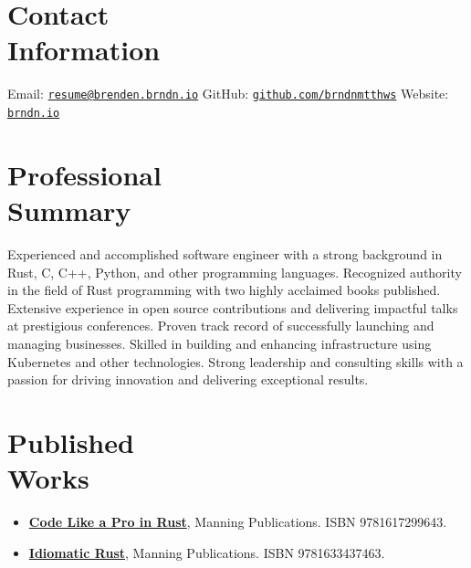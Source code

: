 \documentclass[margin,line]{resume}
\begin{document}
 
\begin{resume}

\section{\mysidestyle Contact\\Information}

Email: \href{mailto:resume@brenden.brndn.io}{\texttt{resume@brenden.brndn.io}} \hfill
GitHub: \href{https://github.com/brndnmtthws}{\texttt{github.com/brndnmtthws}} \hfill
Website: \href{https://brndn.io}{\texttt{brndn.io}} \hfill
\vspace{3mm}

\section{\mysidestyle Professional\\Summary}

Experienced and accomplished software engineer with a strong background in Rust, C, C++, Python, and other programming languages. Recognized authority in the field of Rust programming with two highly acclaimed books published. Extensive experience in open source contributions and delivering impactful talks at prestigious conferences. Proven track record of successfully launching and managing businesses. Skilled in building and enhancing infrastructure using Kubernetes and other technologies. Strong leadership and consulting skills with a passion for driving innovation and delivering exceptional results.

\section{\mysidestyle Published\\Works}
\begin{itemize}
\item \href{https://www.manning.com/books/code-like-a-pro-in-rust}{\textbf{Code Like a Pro in Rust}}, Manning Publications. ISBN 9781617299643.
\item \href{https://www.manning.com/books/idiomatic-rust}{\textbf{Idiomatic Rust}}, Manning Publications. ISBN 9781633437463.
\end{itemize}


\end{resume}
\end{document}
